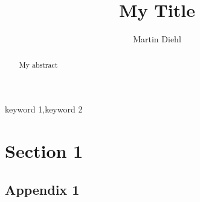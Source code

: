 \documentclass[3p,onecolumn]{elsarticle}
\begin{document}
\begin{frontmatter}

\title{My Title}

\author[MTM,CS]{Martin Diehl}

\address[MTM]{Department of Materials Engineering, KU Leuven, Kasteelpark Arenberg 44, 3001 Leuven, Belgium}
\address[CS]{Department of Computer Science, KU Leuven, Celestijnenlaan 200A, 3001 Leuven, Belgium}

\begin{abstract}
My abstract
\end{abstract}

\begin{keyword}
keyword 1\sep keyword 2
\end{keyword}

\end{frontmatter}

\tableofcontents


\section{Section 1}
\cite{EisenlohrEtAl2013}



\begin{appendices}
\section{Appendix 1}
\end{appendices}
\end{document}
